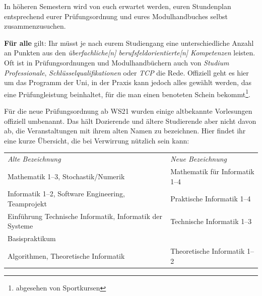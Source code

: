 In höheren Semestern wird von euch erwartet werden, euren Stundenplan
entsprechend eurer Prüfungsordnung und eures Modulhandbuches selbst
zusammenzusuchen. %

\textbf{Für alle} gilt: Ihr müsst je nach eurem Studiengang eine
unterschiedliche Anzahl an Punkten aus den \emph{überfachliche[n]
berufsfeldorientierte[n] Kompetenzen} leisten. Oft ist in Prüfungsordnungen und
Modulhandbüchern auch von \emph{Studium Professionale},
\emph{Schlüsselqualifikationen} oder \emph{TCP} die Rede. Offiziell geht es
hier um das Programm der Uni, in der Praxis kann jedoch alles gewählt werden,
das eine Prüfungleistung beinhaltet, für die man einen benoteten Schein
bekommt\footnote{abgesehen von Sportkursen}.

%

Für die neue Prüfungsordnung ab WS21 wurden einige altbekannte Vorlesungen offiziell umbenannt.
Das hält Dozierende und ältere Studierende aber nicht davon ab, die Veranstaltungen mit
ihrem alten Namen zu bezeichnen. Hier findet ihr eine kurze Übersicht, die bei Verwirrung nützlich sein kann:

\begin{tabular}{ll}
\emph{Alte Bezeichnung}						& \emph{Neue Bezeichnung} \\[.4em]
Mathematik 1--3, Stochastik/Numerik	& Mathematik für Informatik 1--4 \\[.4em]
Informatik 1--2, Software Engineering, Teamprojekt & Praktische Informatik 1--4\\[.4em]
Einführung Technische Informatik, Informatik der Systeme & Technische Informatik 1--3\\
Basispraktikum & \\[.4em]
Algorithmen, Theoretische Informatik	& Theoretische Informatik 1--2 \\[.4em]
\end{tabular}

